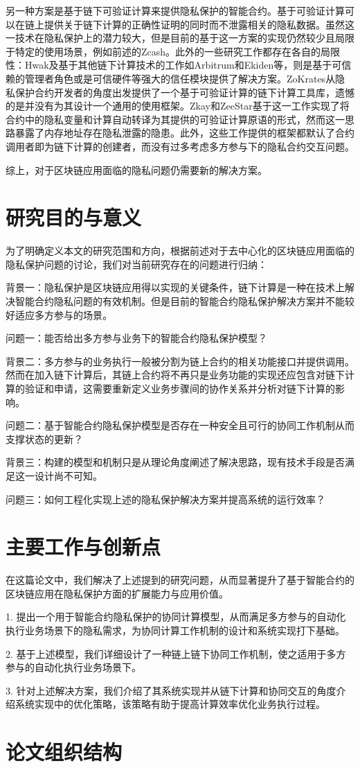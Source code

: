另一种方案是基于链下可验证计算来提供隐私保护的智能合约。基于可验证计算可以在链上提供关于链下计算的正确性证明的同时而不泄露相关的隐私数据。虽然这一技术在隐私保护上的潜力较大，但是目前的基于这一方案的实现仍然较少且局限于特定的使用场景，例如前述的Zcash\cite{Zcash}。此外的一些研究工作都存在各自的局限性：Hwak\cite{7546538}及基于其他链下计算技术的工作如Arbitrum\cite{217511}和Ekiden\cite{2018arXiv180405141C}等，则是基于可信赖的管理者角色或是可信硬件等强大的信任模块提供了解决方案。ZoKrates\cite{8726497}从隐私保护合约开发者的角度出发提供了一个基于可验证计算的链下计算工具库，遗憾的是并没有为其设计一个通用的使用框架。Zkay\cite{2020arXiv200901020B}和ZeeStar\cite{9833732}基于这一工作实现了将合约中的隐私变量和计算自动转译为其提供的可验证计算原语的形式，然而这一思路暴露了内存地址存在隐私泄露的隐患\cite{10.1145/3548606.3560622}。此外，这些工作提供的框架都默认了合约调用者即为链下计算的创建者，而没有过多考虑多方参与下的隐私合约交互问题。

综上，对于区块链应用面临的隐私问题仍需要新的解决方案。
\section{研究目的与意义}

为了明确定义本文的研究范围和方向，根据前述对于去中心化的区块链应用面临的隐私保护问题的讨论，我们对当前研究存在的问题进行归纳：

背景一：隐私保护是区块链应用得以实现的关键条件，链下计算是一种在技术上解决智能合约隐私问题的有效机制。但是目前的智能合约隐私保护解决方案并不能较好适应多方参与的场景。

问题一：能否给出多方参与业务下的智能合约隐私保护模型？

背景二：多方参与的业务执行一般被分割为链上合约的相关功能接口并提供调用。然而在加入链下计算后，其链上合约将不再只是业务功能的实现还应包含对链下计算的验证和申请，这需要重新定义业务步骤间的协作关系并分析对链下计算的影响。

问题二：基于智能合约隐私保护模型是否存在一种安全且可行的协同工作机制从而支撑状态的更新？

背景三：构建的模型和机制只是从理论角度阐述了解决思路，现有技术手段是否满足这一设计尚不可知。

问题三：如何工程化实现上述的隐私保护解决方案并提高系统的运行效率？

\section{主要工作与创新点}

在这篇论文中，我们解决了上述提到的研究问题，从而显著提升了基于智能合约的区块链应用在隐私保护方面的扩展能力与应用价值。

1. 提出一个用于智能合约隐私保护的协同计算模型，从而满足多方参与的自动化执行业务场景下的隐私需求，为协同计算工作机制的设计和系统实现打下基础。

2. 基于上述模型，我们详细设计了一种链上链下协同工作机制，使之适用于多方参与的自动化执行业务场景下。

3. 针对上述解决方案，我们介绍了其系统实现并从链下计算和协同交互的角度介绍系统实现中的优化策略，该策略有助于提高计算效率优化业务执行过程。

\section{论文组织结构}

